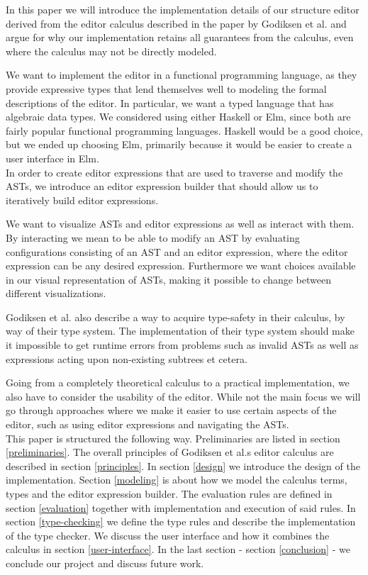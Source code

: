 In this paper we will introduce the implementation details of our structure
editor derived from the editor calculus described in the paper by Godiksen et
al. and argue for why our implementation retains all guarantees from the
calculus, even where the calculus may not be directly modeled.

We want to implement the editor in a functional programming language, as they
provide expressive types that lend themselves well to modeling the formal
descriptions of the editor. In particular, we want a typed language that has
algebraic data types. We considered using either Haskell or Elm, since both are
fairly popular functional programming languages. Haskell would be a good
choice, but we ended up choosing Elm, primarily because it would be easier to
create a user interface in Elm.\\

In order to create editor expressions that are used to traverse and modify the
ASTs, we introduce an editor expression builder that should allow us to
iteratively build editor expressions.

We want to visualize ASTs and editor expressions as well as interact with them.
By interacting we mean to be able to modify an AST by evaluating configurations
consisting of an AST and an editor expression, where the editor expression can
be any desired expression. Furthermore we want choices available in our visual
representation of ASTs, making it possible to change between different
visualizations.

Godiksen et al. also describe a way to acquire type-safety in their calculus,
by way of their type system. The implementation of their type system should
make it impossible to get runtime errors from problems such as invalid ASTs as
well as expressions acting upon non-existing subtrees et cetera.

Going from a completely theoretical calculus to a practical implementation, we
also have to consider the usability of the editor. While not the main focus we
will go through approaches where we make it easier to use certain aspects of
the editor, such as using editor expressions and navigating the ASTs. \\

This paper is structured the following way. Preliminaries are listed in section
\ref{preliminaries}. The overall principles of Godiksen et al.s editor calculus
are described in section \ref{principles}. In section \ref{design} we introduce
the design of the implementation. Section \ref{modeling} is about how we model
the calculus terms, types and the editor expression builder. The evaluation
rules are defined in section \ref{evaluation} together with implementation and
execution of said rules. In section \ref{type-checking} we define the type
rules and describe the implementation of the type checker. We discuss the user
interface and how it combines the calculus in section \ref{user-interface}. In
the last section - section \ref{conclusion} - we conclude our project and
discuss future work.

